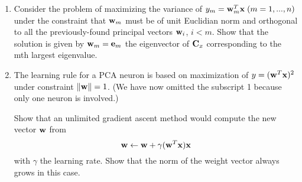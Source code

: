 \documentclass[10pt]{article}
\begin{document}
\begin{enumerate}
\item Consider the problem of maximizing the variance of $y_m = {\bf
  w}_m^T{\bf x}\; (m=1, ..., n)$ under the constraint that ${\bf w}_m$
  must be of unit Euclidian norm and orthogonal to all the
  previously-found principal vectors ${\bf w}_i$, $i<m$. Show that the solution
  is given by ${\bf w}_m={\bf e}_m$ the eigenvector of ${\bf C}_x$ corresponding to the mth
  largest eigenvalue.

\vspace{2mm}

\item The learning rule for a PCA neuron is based on maximization of
  $y=({\bf w}^T{\bf x})^2$ under constraint $ \| {\bf w} \| = 1$. (We have now omitted the
  subscript 1 because only one neuron is involved.)

Show that an unlimited gradient ascent method would compute the new
vector ${\bf w}$ from
\[
{\bf w} \leftarrow {\bf w} + \gamma ({\bf w}^T{\bf x}){\bf x}
\]
with $\gamma$ the learning rate. Show that the norm of the weight
vector always grows in this case.



\end{enumerate}
\end{document}
